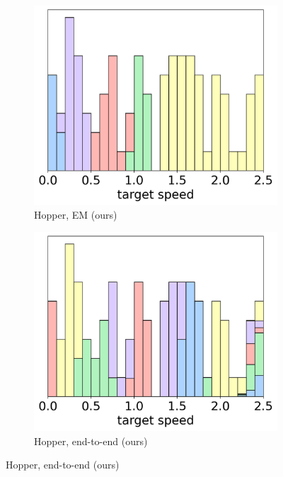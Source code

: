 \begin{figure}[t]
\begin{center}
    \begin{subfigure}{0.3\textwidth}
        \centering
        \caption{Hopper, EM (ours)}
        \includegraphics[width=\linewidth]{pics/histograms/em/Hopper.png}
    \end{subfigure}\hspace{10pt}%
    \begin{subfigure}{0.3\textwidth}
        \centering
        \caption{Hopper, end-to-end (ours)}
        \includegraphics[width=\linewidth]{pics/histograms/end-to-end/Hopper.png}
    \end{subfigure}\hspace{10pt}%

\end{center}
\end{figure}
